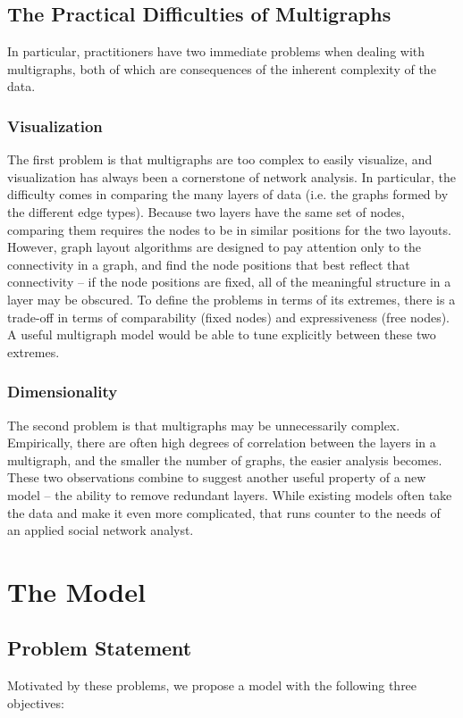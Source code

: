 \documentclass{article}
\begin{document}
\subsection{The Practical Difficulties of Multigraphs}
In particular, practitioners have two immediate problems when dealing with multigraphs, both of which are consequences of the inherent complexity of the data. 
\subsubsection{Visualization}
The first problem is that multigraphs are too complex to easily visualize, and visualization has always been a cornerstone of network analysis. In particular, the difficulty comes in comparing the many layers of data (i.e. the graphs formed by the different edge types). Because two layers have the same set of nodes, comparing them requires the nodes to be in similar positions for the two layouts. However, graph layout algorithms are designed to pay attention only to the connectivity in a graph, and find the node positions that best reflect that connectivity -- if the node positions are fixed, all of the meaningful structure in a layer may be obscured. To define the problems in terms of its extremes, there is a trade-off in terms of comparability (fixed nodes) and expressiveness (free nodes). A useful multigraph model would be able to tune explicitly between these two extremes.

\subsubsection{Dimensionality}
The second problem is that multigraphs may be unnecessarily complex. Empirically, there are often high degrees of correlation between the layers in a multigraph, and the smaller the number of graphs, the easier analysis becomes. These two observations combine to suggest another useful property of a new model -- the ability to remove redundant layers. While existing models often take the data and make it even more complicated, that runs counter to the needs of an applied social network analyst.

\section{The Model}
\subsection{Problem Statement}
Motivated by these problems, we propose a model with the following three objectives:
\end{document}
